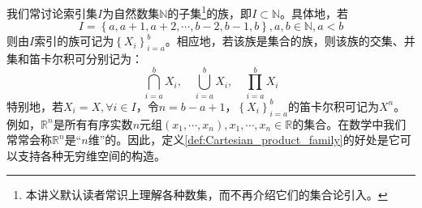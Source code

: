 \documentclass[../main.tex]{subfiles}
\begin{document}
我们常讨论索引集$I$为自然数集$\mathbb{N}$的子集\footnote{本讲义默认读者常识上理解各种数集，而不再介绍它们的集合论引入。}的族，即$I\subset\mathbb{N}$。具体地，若
\[I=\left\{a,a+1,a+2,\cdots,b-2,b-1,b\right\},a,b\in\mathbb{N},a<b\]则由$I$索引的族可记为$\left\{X_i\right\}_{i=a}^b$。相应地，若该族是集合的族，则该族的交集、并集和笛卡尔积可分别记为：
\[
    \bigcap_{i=a}^b X_i,\quad\bigcup_{i=a}^b X_i,\quad\prod_{i=a}^b X_i
\]
特别地，若$X_i=X,\forall i\in I$，令$n=b-a+1$，$\left\{X_i\right\}_{i=a}^b$的笛卡尔积可记为$X^n$。例如，$\mathbb{R}^n$是所有有序实数$n$元组$\left(x_1,\cdots,x_n\right),x_1,\cdots,x_n\in\mathbb{R}$的集合。在数学中我们常常会称$\mathbb{R}^n$是“$n$维”的。因此，定义\ref{def:Cartesian_product_family}的好处是它可以支持各种无穷维空间的构造。
\end{document}
